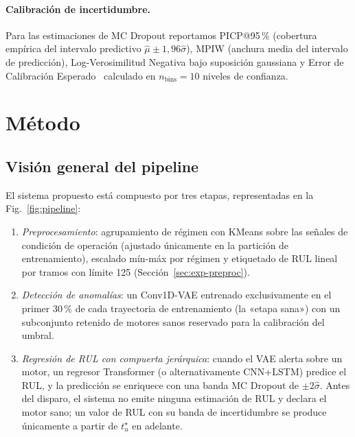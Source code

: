 \documentclass[5p,times,authoryear]{elsarticle}
\begin{document}
\paragraph{Calibración de incertidumbre.} Para las estimaciones de MC Dropout reportamos PICP@95\,\% (cobertura empírica del intervalo predictivo $\hat\mu\pm 1{,}96\hat\sigma$), MPIW (anchura media del intervalo de predicción), Log-Verosimilitud Negativa bajo suposición gaussiana y Error de Calibración Esperado~\citep{guo2017calibration} calculado en $n_{\mathrm{bins}}=10$ niveles de confianza.

\section{Método}\label{sec:method}

\subsection{Visión general del pipeline}\label{sec:method-pipeline}

El sistema propuesto está compuesto por tres etapas, representadas en la Fig.~\ref{fig:pipeline}:
\begin{sloppypar}
\begin{enumerate}
    \item \emph{Preprocesamiento}: agrupamiento de régimen con KMeans sobre las señales de condición de operación (ajustado únicamente en la partición de entrenamiento), escalado mín-máx por régimen y etiquetado de RUL lineal por tramos con límite 125 (Sección~\ref{sec:exp-preproc}).
    \item \emph{Detección de anomalías}: un Conv1D-VAE entrenado exclusivamente en el primer 30\,\% de cada trayectoria de entrenamiento (la «etapa sana») con un subconjunto retenido de motores sanos reservado para la calibración del umbral.
    \item \emph{Regresión de RUL con compuerta jerárquica}: cuando el VAE alerta sobre un motor, un regresor Transformer (o alternativamente CNN+LSTM) predice el RUL, y la predicción se enriquece con una banda MC Dropout de $\pm 2\hat\sigma$. Antes del disparo, el sistema no emite ninguna estimación de RUL y declara el motor sano; un valor de RUL con su banda de incertidumbre se produce únicamente a partir de $t^\star_u$ en adelante.
\end{enumerate}
\end{sloppypar}
\end{document}
